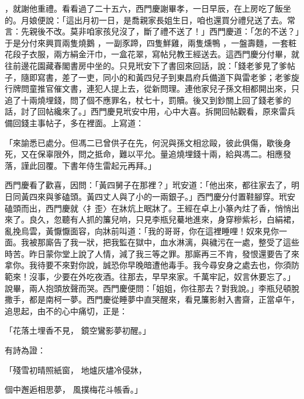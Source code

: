 \begin{showcontents}{}
，就謝他重禮。看看過了二十五六，西門慶謝畢孝，一日早辰，在上房吃了飯坐的。月娘便說：「這出月初一日，是喬親家長姐生日，咱也還買分禮兒送了去。常言：先親後不改。莫非咱家孩兒沒了，斷了禮不送了！」西門慶道：「怎的不送？」于是分付來興買兩隻燒鵝 ，一副豕蹄，四隻鮮雞，兩隻燻鴨 ，一盤壽麵，一套粧花段子衣服，兩方絹金汗巾，一盒花翠，寫帖兒教王經送去。這西門慶分付畢，就往前邊花園藏春閣書房中坐的。只見玳安下了書回來回話，說：「錢老爹見了爹帖子，隨即寫書，差了一吏，同小的和黃四兒子到東昌府兵備道下與雷老爹；老爹旋行牌問童推官催文書，連犯人提上去，從新問理。連他家兒子孫文相都開出來，只追了十兩燒埋錢，問了個不應罪名，杖七十，罰贖。後又到鈔關上回了錢老爹的話，討了回帖纔來了。」西門慶見玳安中用，心中大喜。拆開回帖觀看，原來雷兵備回錢主事帖子，多在裡面。上寫道：

「來諭悉已處分。但馮二已曾供子在先，何況與孫文相忿毆，彼此俱傷，歇後身死，又在保辜限外，問之抵命，難以平允。量追燒埋錢十兩，給與馮二。相應發落，謹此回覆。下書年侍生雷起元再拜。」

西門慶看了歡喜，因問：「黃四舅子在那裡？」玳安道：「他出來，都往家去了，明日同黃四來與爹磕頭。黃四丈人與了小的一兩銀子。」西門慶分付置鞋腳穿。玳安磕頭而出，西門慶就〈扌歪〉在牀炕上眠牀了。王經在卓上小篆內炷了香，悄悄出來了。良久，忽聽有人抓的簾兒响，只見李瓶兒驀地進來，身穿糝紫衫，白絹裙，亂挽烏雲，黃懨懨面容，向牀前叫道：「我的哥哥，你在這裡睡哩！奴來見你一面。我被那廝告了我一狀，把我監在獄中，血水淋漓，與穢污在一處，整受了這些時苦。昨日蒙你堂上說了人情，減了我三等之罪。那廝再三不肯，發恨還要告了來拿你。我待要不來對你說，誠恐你早晚暗遭他毒手。我今尋安身之處去也，你須防範來！沒事，少要在外吃夜酒。往那去，早早來家。千萬牢記，奴言休要忘了。」說畢，兩人抱頭放聲而哭。西門慶便問：「姐姐，你往那去？對我說。」李瓶兒頓脫撒手，都是南柯一夢。西門慶從睡夢中直哭醒來，看見簾影射入書齋，正當卓午，追思起，由不的心中痛切，正是：

「花落土埋香不見，  鏡空鸞影夢初醒。」

有詩為證：

「殘雪初晴照紙窗，  地爐灰燼冷侵牀，

個中邂逅相思夢，  風撲梅花斗帳香。」


\end{showcontents}
